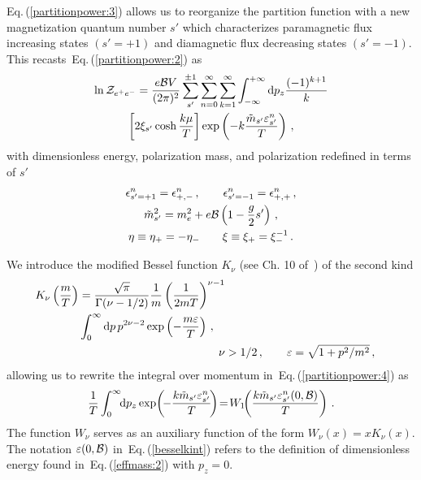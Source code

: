 \documentclass[aps,prd,floatfix,reprint]{revtex4-2}
\newcommand{\req}[1]{Eq.\,(\ref{#1})}
\begin{document}
\req{partitionpower:3} allows us to reorganize the partition function with a new magnetization quantum number $s'$ which characterizes paramagnetic flux increasing states $(s'=+1)$ and diamagnetic flux decreasing states $(s'=-1)$. This recasts~\req{partitionpower:2} as
\begin{multline}
 \label{partitionpower:4}
 \ln{{\cal Z}_{e^{+}e^{-}}}=\frac{e{\cal B}V}{(2\pi)^{2}}\sum_{s'}^{\pm1}\sum_{n=0}^{\infty}\sum_{k=1}^{\infty}\int_{-\infty}^{+\infty}{\rm d}p_{z}\frac{(-1)^{k+1}}{k}\\
 \left[2\xi_{s'}\cosh\frac{k\mu}{T}\right]\exp\left(-k\frac{{\tilde m}_{s'}\varepsilon_{s'}^{n}}{T}\right)\,,
\end{multline}
with dimensionless energy, polarization mass, and polarization redefined in terms of $s'$
\begin{gather}
 \epsilon_{s'=+1}^{n}=\epsilon_{+,-}^{n}\,,\qquad
 \epsilon_{s'=-1}^{n}=\epsilon_{+,+}^{n}\,,\\
 {\tilde m}_{s'}^{2}=m_{e}^{2}+e{\cal B}\left(1-\frac{g}{2}s'\right)\,,\\
 \eta\equiv\eta_{+}=-\eta_{-}\qquad\xi\equiv\xi_{+}=\xi_{-}^{-1}\,.
\end{gather}

We introduce the modified Bessel function $K_{\nu}$ (see Ch. 10 of~\cite{Letessier:2002ony}) of the second kind
\begin{align}
\begin{split}
\label{besselk}
K_{\nu}\left(\frac{m}{T}\right)&=\frac{\sqrt{\pi}}{\Gamma(\nu-1/2)}\frac{1}{m}\left(\frac{1}{2mT}\right)^{\nu-1}\\
&\int_{0}^{\infty}{\rm d}p\,p^{2\nu-2}\exp\left({-\frac{m\varepsilon}{T}}\right)\,,
\end{split}\\
\nu&>1/2\,,\qquad\varepsilon=\sqrt{1+p^{2}/m^{2}}\,,
\end{align}
allowing us to rewrite the integral over momentum in~\req{partitionpower:4} as
\begin{align}
 \label{besselkint}
 \frac{1}{T}\int_{0}^{\infty}\!\!{\rm d}p_{z}\exp\!\left(\!{-\frac{k{\tilde m}_{s'}\varepsilon_{s'}^{n}}{T}}\!\right)\!=\!W_{1}\!\!\left(\frac{k{\tilde m}_{s'}\varepsilon_{s'}^{n}(0,{\cal B})}{T}\right)\,.
\end{align}
The function $W_{\nu}$ serves as an auxiliary function of the form $W_{\nu}(x)=xK_{\nu}(x)$. The notation $\varepsilon(0,{\cal B})$ in~\req{besselkint} refers to the definition of dimensionless energy found in~\req{effmass:2} with $p_{z}=0$.
\end{document}
